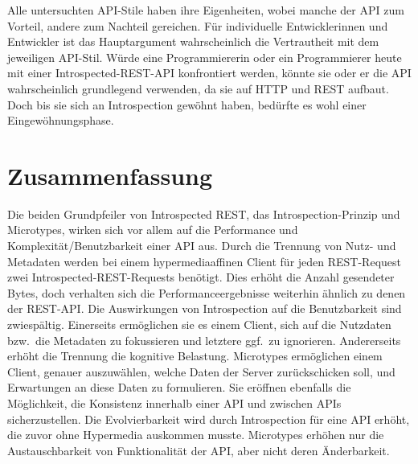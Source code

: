 Alle untersuchten API-Stile haben ihre Eigenheiten, wobei manche der API zum Vorteil, andere zum Nachteil gereichen. Für individuelle Entwicklerinnen und Entwickler ist das Hauptargument wahrscheinlich die Vertrautheit mit dem jeweiligen API-Stil. Würde eine Programmiererin oder ein Programmierer heute mit einer Introspected-REST-API konfrontiert werden, könnte sie oder er die API wahrscheinlich grundlegend verwenden, da sie auf HTTP und REST aufbaut. Doch bis sie sich an Introspection gewöhnt haben, bedürfte es wohl einer Eingewöhnungsphase.

\section{Zusammenfassung}

Die beiden Grundpfeiler von Introspected REST, das Introspection-Prinzip und Microtypes, wirken sich vor allem auf die Performance und Komplexität/Benutzbarkeit einer API aus. Durch die Trennung von Nutz- und Metadaten werden bei einem hypermediaaffinen Client für jeden REST-Request zwei Introspected-REST-Requests benötigt. Dies erhöht die Anzahl gesendeter Bytes, doch verhalten sich die Performanceergebnisse weiterhin ähnlich zu denen der REST-API. Die Auswirkungen von Introspection auf die Benutzbarkeit sind zwiespältig. Einerseits ermöglichen sie es einem Client, sich auf die Nutzdaten bzw.\ die Metadaten zu fokussieren und letztere ggf.\ zu ignorieren. Andererseits erhöht die Trennung die kognitive Belastung. Microtypes ermöglichen einem Client, genauer auszuwählen, welche Daten der Server zurückschicken soll, und Erwartungen an diese Daten zu formulieren. Sie eröffnen ebenfalls die Möglichkeit, die Konsistenz innerhalb einer API und zwischen APIs sicherzustellen. Die Evolvierbarkeit wird durch Introspection für eine API erhöht, die zuvor ohne Hypermedia auskommen musste. Microtypes erhöhen nur die Austauschbarkeit von Funktionalität der API, aber nicht deren Änderbarkeit.